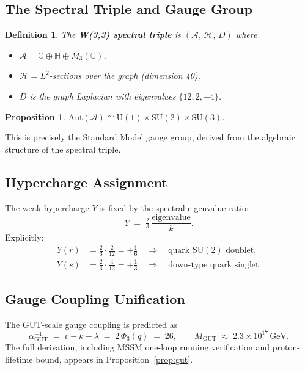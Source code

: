 \documentclass[12pt,a4paper]{article}
\newtheorem{proposition}[theorem]{Proposition}
\newtheorem{definition}[theorem]{Definition}
\newcommand{\alphaGUT}{\alpha_{\!\mathrm{GUT}}}
\newcommand{\MGUT}{M_{\!\mathrm{GUT}}}
\begin{document}
\subsection{The Spectral Triple and Gauge Group}

\begin{definition}
The \textbf{W(3,3) spectral triple} is $(\mathcal{A},\,\mathcal{H},\,D)$
where
\begin{itemize}
  \item $\mathcal{A} = \mathbb{C}\oplus\mathbb{H}\oplus M_3(\mathbb{C})$,
  \item $\mathcal{H} = L^2$-sections over the graph (dimension 40),
  \item $D$ is the graph Laplacian with eigenvalues $\{12, 2, -4\}$.
\end{itemize}
\end{definition}

\begin{proposition}
$\mathrm{Aut}(\mathcal{A}) \cong \mathrm{U}(1)\times\mathrm{SU}(2)\times\mathrm{SU}(3).$
\end{proposition}

This is precisely the Standard Model gauge group, derived from the
algebraic structure of the spectral triple.

\subsection{Hypercharge Assignment}

The weak hypercharge $Y$ is fixed by the spectral eigenvalue ratio:
\[
  Y \;=\; \tfrac{2}{3}\,\frac{\text{eigenvalue}}{k}.
\]
Explicitly:
\begin{align}
  Y(r) &= \tfrac{2}{3}\cdot\tfrac{2}{12} = +\tfrac{1}{6}
        \quad\Rightarrow\quad \text{quark $\mathrm{SU}(2)$ doublet,}\\
  Y(s) &= \tfrac{2}{3}\cdot\tfrac{4}{12} = +\tfrac{1}{3}
        \quad\Rightarrow\quad \text{down-type quark singlet.}
\end{align}

\subsection{Gauge Coupling Unification}

The GUT-scale gauge coupling is predicted as
\[
  \alphaGUT^{-1} \;=\; v - k - \lambda \;=\; 2\,\Phi_3(q) \;=\; 26,
  \qquad
  \MGUT \;\approx\; 2.3\times 10^{17}\,\mathrm{GeV}.
\]
The full derivation, including MSSM one-loop running verification and
proton-lifetime bound, appears in Proposition~\ref{prop:gut}.
\end{document}

